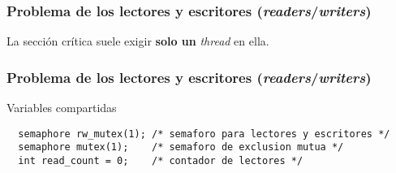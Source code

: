 \documentclass[letter]{beamer}
\begin{document}
\begin{frame}
  \frametitle{Problema de los lectores y escritores ({\em readers}/{\em writers})}

  La sección crítica suele exigir {\bf solo un} {\em thread} en ella.

  
  
  
  
  
\end{frame}

\begin{frame}[fragile]
  \frametitle{Problema de los lectores y escritores ({\em readers}/{\em writers})}

  Variables compartidas
\begin{verbatim}
  semaphore rw_mutex(1); /* semaforo para lectores y escritores */
  semaphore mutex(1);    /* semaforo de exclusion mutua */
  int read_count = 0;    /* contador de lectores */
\end{verbatim}

\end{frame}
\end{document}
